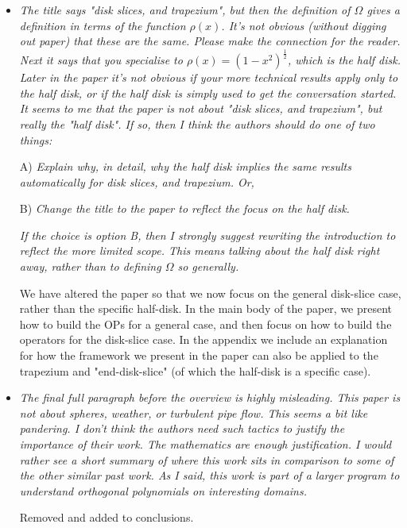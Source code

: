 \documentclass[10pt]{letter}
\newcommand{\comment}[1]{\textit{\color{bluey}#1}}
\newcommand{\half}{\frac{1}{2}}
\begin{document}
\begin{itemize}[parsep=1em,leftmargin=1em]

\item \comment{The title says "disk slices, and trapezium", but then the definition of $\Omega$ gives a definition in terms of the function $\rho(x)$. It's not obvious (without digging out paper) that these are the same. Please make the connection for the reader. Next it says that you specialise to $\rho(x) = (1-x^2)^\half$, which is the half disk. Later in the paper it's not obvious if your more technical results apply only to the half disk, or if the half disk is simply used to get the conversation started. It seems to me that the paper is not about "disk slices, and trapezium", but really the "half disk". If so, then I think the authors should do one of two things:}

A) \comment{Explain why, in detail, why the half disk implies the same results automatically for disk slices, and trapezium. Or,}

B) \comment{Change the title to the paper to reflect the focus on the half disk. }

\comment{If the choice is option B, then I strongly suggest rewriting the introduction to reflect the more limited scope. This means talking about the half disk right away, rather than to defining $\Omega$ so generally.}

We have altered the paper so that we now focus on the general disk-slice case, rather than the specific half-disk. In the main body of the paper, we present how to build the OPs for a general case, and then focus on how to build the operators for the disk-slice case. In the appendix we include an explanation for how the framework we present in the paper can also be applied to the trapezium and "end-disk-slice" (of which the half-disk is a specific case).


\item \comment{The final full paragraph before the overview is highly misleading. This paper is not about spheres, weather, or turbulent pipe flow. This seems a bit like pandering. I don't think the authors need such tactics to justify the importance of their work. The mathematics are enough justification. I would rather see a short summary of where this work sits in comparison to some of the other similar past work. As I said, this work is part of a larger program to understand orthogonal polynomials on interesting domains.}

Removed and added to conclusions.



\end{itemize}
\end{document}
